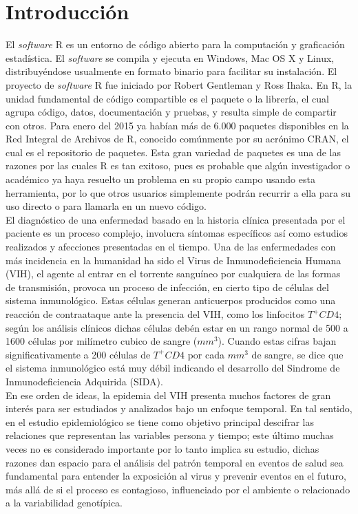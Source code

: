 
\chapter*{Introducci\'on}

El \textit{software} R es un entorno de c\'odigo abierto para la computaci\'on y graficaci\'on estad\'istica. El \textit{software} se compila y ejecuta en Windows, Mac OS X y Linux, distribuy\'endose usualmente en formato binario para facilitar su instalaci\'on. El proyecto de \textit{software} R fue iniciado por Robert Gentleman y Ross Ihaka. En R, la unidad fundamental de c\'odigo compartible es el paquete o la librer\'ia, el cual agrupa c\'odigo, datos, documentaci\'on y pruebas, y resulta simple de compartir con otros. Para enero del 2015 ya hab\'ian m\'as de 6.000 paquetes disponibles en la Red Integral de Archivos de R, conocido com\'unmente por su acr\'onimo CRAN, el cual es el repositorio de paquetes. Esta gran variedad de paquetes es una de las razones por las cuales R es tan exitoso, pues es probable que alg\'un investigador o acad\'emico ya haya resuelto un problema en su propio campo usando esta herramienta, por lo que otros usuarios simplemente podr\'an recurrir a ella para su uso directo o para llamarla en un nuevo c\'odigo.\\

	El diagn\'ostico de una enfermedad basado en la historia cl\'inica presentada por el paciente es un proceso complejo, involucra s\'intomas espec\'ificos as\'i como estudios realizados y afecciones presentadas en el tiempo. Una de las enfermedades con m\'as incidencia en la humanidad ha sido el Virus de Inmunodeficiencia Humana (VIH), el agente al entrar en el torrente sangu\'ineo por cualquiera de las formas de transmisi\'on, provoca un proceso de infecci\'on, en cierto tipo de c\'elulas del sistema inmunol\'ogico. Estas c\'elulas generan anticuerpos producidos como una reacci\'on de contraataque ante la presencia del VIH,  como los linfocitos $T^{+}CD4$; seg\'un los an\'alisis cl\'inicos dichas c\'elulas deb\'en estar en un rango normal de 500 a 1600 c\'elulas por mil\'imetro cubico de sangre ($mm^{3}$). Cuando estas cifras bajan significativamente a 200 c\'elulas de $T^{+}CD4$ por cada $mm^{3}$ de sangre, se dice que el sistema inmunol\'ogico est\'a muy d\'ebil indicando el desarrollo del Sindrome de Inmunodeficiencia Adquirida (SIDA).\\  

	En ese orden de ideas, la epidemia del VIH presenta muchos factores de gran inter\'es para ser estudiados y analizados bajo un enfoque temporal. En tal sentido, en el estudio epidemiol\'ogico se tiene como objetivo principal descifrar las relaciones que representan las variables persona y tiempo; este \'ultimo muchas veces no es considerado importante por lo tanto implica su estudio, dichas razones dan espacio para el an\'alisis del patr\'on temporal en eventos de salud sea fundamental para entender la exposici\'on al virus y prevenir eventos en el futuro, m\'as all\'a de si el proceso es contagioso, influenciado por el ambiente o relacionado a la variabilidad genot\'ipica. \\
	
